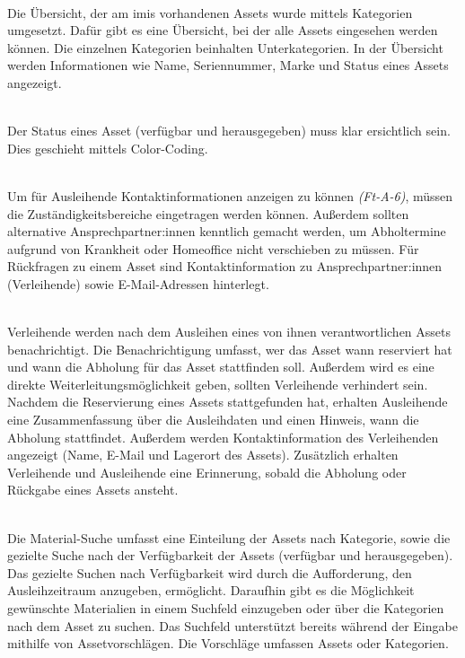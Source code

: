     {\sffamily\color{maincolor}{Ft-VA-2 | Übersicht über ausleihbare Assets }}\\
Die Übersicht, der am \ac{imis} vorhandenen Assets wurde mittels Kategorien
umgesetzt. Dafür gibt es eine Übersicht, bei der alle Assets eingesehen werden
können. Die einzelnen Kategorien beinhalten Unterkategorien. In der Übersicht
werden Informationen wie Name, Seriennummer, Marke und Status eines Assets
angezeigt.

    {\sffamily\color{maincolor}{Ft-VA-3 |  Verfügbarkeit von Assets }}\\
Der Status eines Asset (verfügbar und herausgegeben) muss klar ersichtlich
sein. Dies geschieht mittels Color-Coding.  


{\sffamily\color{maincolor}{Ft-VA-4 | Zuständigkeitsbereich }}\\
Um für Ausleihende Kontaktinformationen anzeigen zu können \textit{(Ft-A-6)},
müssen die Zuständigkeitsbereiche eingetragen werden können. Außerdem sollten
alternative Ansprechpartner:innen kenntlich gemacht werden, um Abholtermine
aufgrund von Krankheit oder Homeoffice nicht verschieben zu müssen. Für
Rückfragen zu einem Asset sind Kontaktinformation zu Ansprechpartner:innen
(Verleihende) sowie E-Mail-Adressen hinterlegt.

    {\sffamily\color{maincolor}{Ft-VA-5 | Benachrichtigungen \& Erinnerungen
        }}\\
Verleihende werden nach dem Ausleihen eines von ihnen verantwortlichen Assets
benachrichtigt. Die Benachrichtigung umfasst, wer das Asset wann reserviert hat
und wann die Abholung für das Asset stattfinden soll. Außerdem wird es eine
direkte Weiterleitungsmöglichkeit geben, sollten Verleihende verhindert sein.
Nachdem die Reservierung eines Assets stattgefunden hat, erhalten Ausleihende
eine Zusammenfassung über die Ausleihdaten und einen Hinweis, wann die Abholung
stattfindet. Außerdem werden Kontaktinformation des Verleihenden angezeigt
(Name, E-Mail und Lagerort des Assets). Zusätzlich erhalten Verleihende und
Ausleihende eine Erinnerung, sobald die Abholung oder Rückgabe eines Assets
ansteht.


    {\sffamily\color{maincolor}{Ft-VA-6 | Material-Suche }}\\
Die Material-Suche umfasst eine Einteilung der Assets nach Kategorie, sowie die gezielte Suche nach
der Verfügbarkeit der Assets (verfügbar und herausgegeben). Das gezielte Suchen nach Verfügbarkeit
wird durch die Aufforderung, den Ausleihzeitraum anzugeben, ermöglicht. Daraufhin gibt es die
Möglichkeit gewünschte Materialien in einem Suchfeld einzugeben oder über die Kategorien nach dem
Asset zu suchen. Das Suchfeld unterstützt bereits während der Eingabe mithilfe von Assetvorschlägen.
Die Vorschläge umfassen Assets oder Kategorien.

